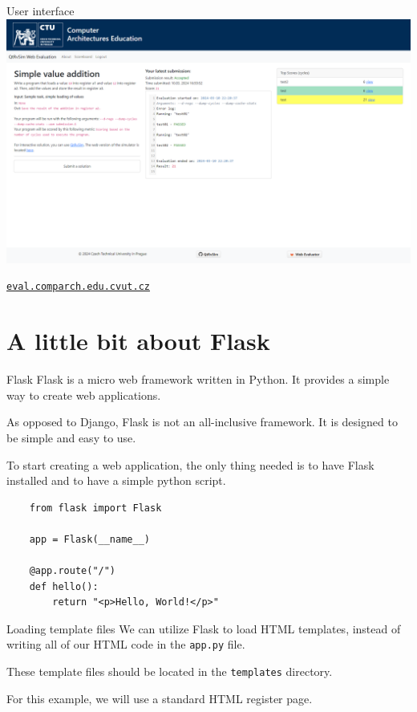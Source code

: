 \documentclass{beamer}
\begin{document}
	\begin{frame}{User interface}
		\centering
		\includegraphics[width=1.0\textwidth]{images/ui.png}

		\href{http://eval.comparch.edu.cvut.cz}{\texttt{eval.comparch.edu.cvut.cz}}
	\end{frame}

	\section{A little bit about Flask}
	
	\begin{frame}{Flask}
		Flask is a micro web framework written in Python. It provides a simple way to create web applications. \par

		As opposed to Django, Flask is not an all-inclusive framework. It is designed to be simple and easy to use. \par

		To start creating a web application, the only thing needed is to have Flask installed and to have a simple python script.
	\end{frame}

	\begin{frame}[fragile]
		\begin{verbatim}
	from flask import Flask

	app = Flask(__name__)

	@app.route("/")
	def hello():
		return "<p>Hello, World!</p>"
		\end{verbatim}
	\end{frame}

	\begin{frame}{Loading template files}
		We can utilize Flask to load HTML templates, instead of writing all of our HTML code in the \texttt{app.py} file. \par
		
		These template files should be located in the \texttt{templates} directory. \par

		For this example, we will use a standard HTML register page.
	\end{frame}
\end{document}
